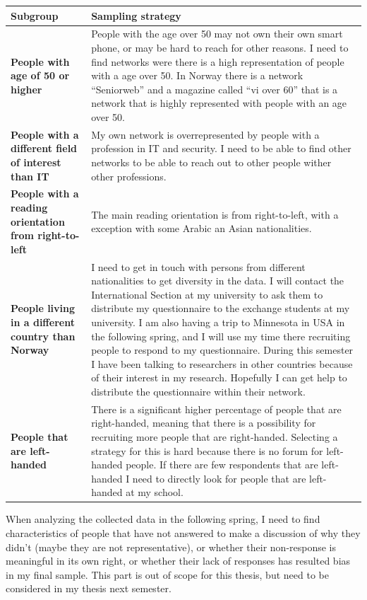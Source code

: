     \begin{tabular}{| p{4cm} | p{7cm} |}
      \hline
      {\bf Subgroup} & {\bf Sampling strategy} \\ \hline
      {\bf People with age of 50 or higher} & People with the age over 50 may not own their own smart phone, or may be hard to reach for other reasons. I need to find networks were there is a high representation of people with a age over 50. In Norway there is a network ``Seniorweb'' and a magazine called ``vi over 60'' that is a network that is highly represented with people with an age over 50. \\ \hline
      {\bf People with a different field of interest than IT} & My own network is overrepresented by people with a profession in IT and security. I need to be able to find other networks to be able to reach out to other people wither other professions. \\ \hline
      {\bf People with a reading orientation from right-to-left} & The main reading orientation is from right-to-left, with a exception with some Arabic an Asian nationalities. \\ \hline
      {\bf People living in a different country than Norway} & I need to get in touch with persons from different nationalities to get diversity in the data. I will contact the International Section at my university to ask them to distribute my questionnaire to the exchange students at my university. I am also having a trip to Minnesota in USA in the following spring, and I will use my time there recruiting people to respond to my questionnaire. During this semester I have been talking to researchers in other countries because of their interest in my research. Hopefully I can get help to distribute the questionnaire within their network. \\ \hline
      {\bf People that are left-handed} & There is a significant higher percentage of people that are right-handed, meaning that there is a possibility for recruiting more people that are right-handed. Selecting a strategy for this is hard because there is no forum for left-handed people. If there are few respondents that are left-handed I need to directly look for people that are left-handed at my school.\\ \hline
    \end{tabular}

    When analyzing the collected data in the following spring, I need to find characteristics of people that have not answered to make a discussion of why they didn't (maybe they are not representative), or whether their non-response is meaningful in its own right, or whether their lack of responses has resulted bias in my final sample. This part is out of scope for this thesis, but need to be considered in my thesis next semester.
  
